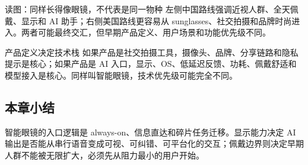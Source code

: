 \begin{knowledgebox}{读图：同样长得像眼镜，不代表是同一物种}
左侧中国路线强调近视人群、全天佩戴、显示和 AI 助手；右侧美国路线更容易从 sunglasses、社交拍摄和品牌时尚进入。两者可能最终交汇，但早期产品定义、用户场景和功能优先级不同。
\end{knowledgebox}

\begin{importantbox}{产品定义决定技术栈}
如果产品是社交拍摄工具，摄像头、品牌、分享链路和隐私提示是核心；如果产品是 AI 入口，显示、OS、低延迟反馈、功耗、佩戴舒适和模型接入是核心。同样叫智能眼镜，技术优先级可能完全不同。
\end{importantbox}

\subsection{本章小结}

智能眼镜的入口逻辑是 always-on、信息直达和碎片任务迁移。显示能力决定 AI 输出是否能从串行语音变成可视、可纠错、可平台化的交互；佩戴边界则决定早期人群不能被无限扩大，必须先从阻力最小的用户开始。

